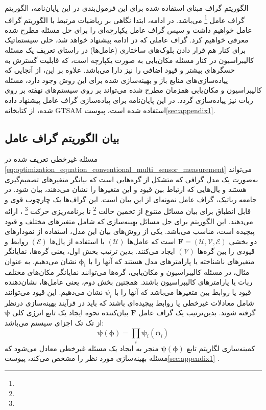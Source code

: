 الگوریتم گراف مبنای استفاده شده برای این فرمول‌بندی در این پایان‌نامه، الگوریتم گراف عامل
\footnote{}
می‌باشد. در ادامه، ابتدا نگاهی بر ریاضیات مرتبط با الگوریتم گراف عامل خواهیم داشت و سپس گراف عامل یکپارچه‌ای را برای حل مسئله مطرح شده معرفی خواهیم کرد. گراف عاملی که در ادامه پیشنهاد خواهد شد، حلی سیستماتیک برای کنار هم قرار دادن بلوک‌های ساختاری (عامل‌ها) در راستای تعریف یک مسئله کالیبراسیون در کنار مسئله مکان‌یابی به صورت یکپارچه است، که قابلیت گسترش به حسگرهای بیشتر و قیود اضافی را نیز دارا می‌باشد. علاوه بر این، از آنجایی که پیاده‌سازی‌های منابع باز و بهینه‌سازی شده برای این روش وجود دارد، مسئله کالیبراسیون و مکان‌یابی همزمان مطرح شده می‌تواند بر روی سیستم‌های نهفته بر روی ربات نیز پیاده‌سازی گردد. در این پایان‌نامه برای پیاده‌سازی گراف عامل پیشنهاد داده شده، از کتابخانه GTSAM استفاده شده است، پیوست\ref{sec:appendix1}. 

\subsection{بیان الگوریتم گراف عامل}
مسئله غیرخطی تعریف شده در 
\ref{eq:optimization_equation_conventional_multi_sensor_measurement}
می‌تواند به‌صورت یک مدل گرافی که متشکل از گره‌هایی است که بیانگر متغیرهای تصمیم‌گیری هستند و یال‌هایی که ارتباط بین قیود و این متغیرها را نشان می‌دهند، بیان شود. در جامعه رباتیک، گراف عامل نمونه‌ای از این بیان است. این گراف‌ها یک چارچوب قوی و قابل انطباق برای بیان مسائل متنوع از تخمین حالت
\footnote{}
 تا برنامه‌ریزی حرکت
\footnote{}
 ، ارائه می‌دهند.  این الگوریتم برای حل مسائل بهینه‌سازی که شامل متغیرهای مختلف و قیود پیچیده است، مناسب می‌باشد. یکی از روش‌های بیان این مدل، استفاده از نمودارهای دو بخشی
$\boldsymbol{F} = (\mathcal{U}, \mathcal{V}, \mathcal{E})$
است که  عامل‌ها 
$(\mathcal{U})$
با استفاده از یال‌ها
$(\mathcal{E})$
روابط و قیودی را بین گره‌ها 
$(\mathcal{V})$
 ایجاد می‌کنند. بدین ترتیب بخش اول، یعنی گره‌ها، نمایانگر متغیرهای ناشناخته یا پارامترهای مدل هستند که آنها را با
$\boldsymbol{\phi_i}$
نشان می‌دهیم. به عنوان مثال، در مسئله کالیبراسیون و مکان‌یابی، گره‌ها می‌توانند نمایانگر مکان‌های مختلف ربات یا پارامترهای کالیبراسیون باشند. همچنین بخش دوم، یعنی عامل‌ها، نشان‌دهنده قیود یا روابط بین متغیرها می‌باشد که آنها را با
$\psi_i$
نشان می‌دهیم. این قیود می‌توانند شامل معادلات غیرخطی یا روابط پیچیده‌ای باشند که باید در فرآیند بهینه‌سازی درنظر گرفته شوند. بدین‌ترتیب یک گراف عامل 
$\boldsymbol{F}$
بیان‌کننده نحوه ایجاد یک تابع انرژی کلی
$\boldsymbol{\psi}$
از تک تک اجزای سیستم می‌باشد:
\begin{equation} 
	\boldsymbol{\psi}(\boldsymbol{\phi}) = \prod_{i} \boldsymbol{\psi}_i(\boldsymbol{\phi}_i) 
\end{equation}
کمینه‌سازی لگاریتم تابع 
$\boldsymbol{\psi}(\boldsymbol{\phi})$
منجر به ایجاد یک مسئله غیرخطی معادل می‌شود که مسئله بهینه‌سازی مورد نظر را مشخص می‌کند، پیوست\ref{sec:appendix1} .


